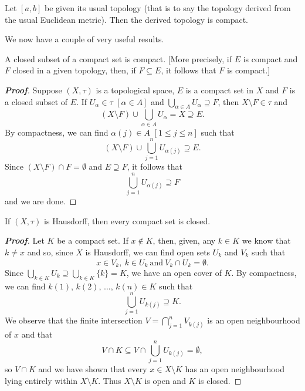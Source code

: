 \begin{theorem}\label{T;closed interval compact}
Let $[a,b]$ be given its usual topology
(that is to say the topology derived
from the usual Euclidean metric).
Then the derived topology is compact.
\end{theorem}

We now have a couple of very useful results.


\begin{theorem}\label{T;closed subset compact}
A closed subset of a compact set is compact.
[More precisely, if $E$ is compact and $F$ closed
in a given topology, then, if $F\subseteq E$, it follows that
$F$ is compact.]
\end{theorem}
\begin{proof}[\bf Proof] Suppose $(X,\tau)$ is a topological space,
$E$ is a compact set in $X$ and $F$ is a closed subset of $E$.
If $U_{\alpha}\in\tau$ $[\alpha\in A]$ and
$\bigcup_{\alpha\in A}U_{\alpha}\supseteq F$, then
$X\setminus F\in\tau$ and
\[(X\setminus F)\cup\bigcup_{\alpha\in A}U_{\alpha}=X\supseteq E.\]
By compactness, we can find $\alpha(j)\in A$
$[1\leq j\leq n]$ such that
\[(X\setminus F)\cup\bigcup_{j=1}^{n}U_{\alpha(j)}\supseteq E.\]
Since $(X\setminus F)\cap F=\emptyset$ and $E\supseteq F$,
it follows that
\[\bigcup_{j=1}^{n}U_{\alpha(j)}\supseteq F\]
and we are done.
\end{proof}


\begin{theorem}\label{T;compact closed}
If $(X,\tau)$ is Hausdorff, then every compact set is closed.
\end{theorem}

\begin{proof}[\bf Proof] Let $K$ be a compact set. If $x\notin K$,
then, given, any $k\in K$ we know that $k\neq x$ and so,
since $X$ is Hausdorff, we can find open sets $U_{k}$
and $V_{k}$ such that
\[x\in V_{k},\ k\in U_{k}\ \text{and}\ V_{k}\cap U_{k}=\emptyset.\]
Since $\bigcup_{k\in K}U_{k}\supseteq\bigcup_{k\in K}\{k\}=K$,
we have an open cover of $K$. By compactness, we can find
$k(1),\,k(2),\,\dots,\,k(n)\in K$ such that
\[\bigcup_{j=1}^{n}U_{k(j)}\supseteq K.\]
We observe that the finite intersection $V=\bigcap_{j=1}^{n}V_{k(j)}$
is an open neighbourhood of $x$ and that
\[V\cap K\subseteq V\cap\bigcup_{j=1}^{n}U_{k(j)}=\emptyset,\]
so $V\cap K$ and we have shown that every $x\in X\setminus K$ has an
open neighbourhood lying entirely within $X\setminus K$.
Thus $X\setminus K$ is open and $K$ is closed.
\end{proof}


